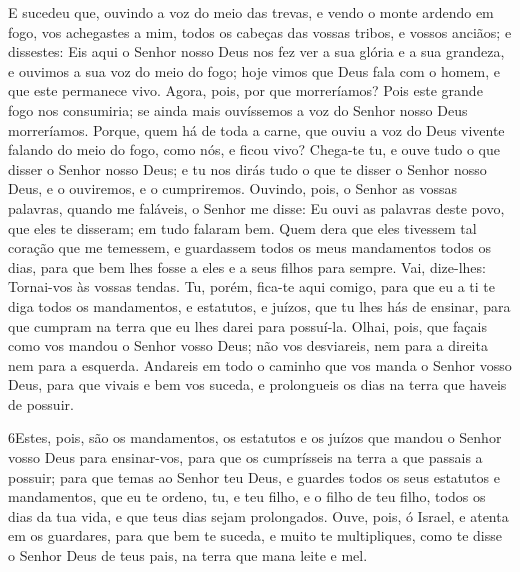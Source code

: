 E sucedeu que, ouvindo a voz do meio das trevas, e vendo o monte
ardendo em fogo, vos achegastes a mim, todos os cabeças das vossas
tribos, e vossos anciãos; e dissestes: Eis aqui o Senhor
nosso Deus nos fez ver a sua glória e a sua grandeza, e ouvimos a
sua voz do meio do fogo; hoje vimos que Deus fala com o homem, e que
este permanece vivo. Agora, pois, por que morreríamos? Pois
este grande fogo nos consumiria; se ainda mais ouvíssemos a voz do
Senhor nosso Deus morreríamos. Porque, quem há de toda a
carne, que ouviu a voz do Deus vivente falando do meio do fogo, como
nós, e ficou vivo? Chega-te tu, e ouve tudo o que disser o
Senhor nosso Deus; e tu nos dirás tudo o que te disser o Senhor
nosso Deus, e o ouviremos, e o cumpriremos. Ouvindo, pois, o
Senhor as vossas palavras, quando me faláveis, o Senhor me disse: Eu
ouvi as palavras deste povo, que eles te disseram; em tudo falaram
bem. Quem dera que eles tivessem tal coração que me temessem,
e guardassem todos os meus mandamentos todos os dias, para que bem
lhes fosse a eles e a seus filhos para sempre. Vai,
dize-lhes: Tornai-vos às vossas tendas. Tu, porém, fica-te
aqui comigo, para que eu a ti te diga todos os mandamentos, e
estatutos, e juízos, que tu lhes hás de ensinar, para que cumpram na
terra que eu lhes darei para possuí-la. Olhai, pois, que
façais como vos mandou o Senhor vosso Deus; não vos desviareis, nem
para a direita nem para a esquerda. Andareis em todo o
caminho que vos manda o Senhor vosso Deus, para que vivais e bem vos
suceda, e prolongueis os dias na terra que haveis de possuir.

\medskip

\lettrine{6} Estes, pois, são os mandamentos, os estatutos e
os juízos que mandou o Senhor vosso Deus para ensinar-vos, para que
os cumprísseis na terra a que passais a possuir; para que temas
ao Senhor teu Deus, e guardes todos os seus estatutos e mandamentos,
que eu te ordeno, tu, e teu filho, e o filho de teu filho, todos os
dias da tua vida, e que teus dias sejam prolongados. Ouve, pois,
ó Israel, e atenta em os guardares, para que bem te suceda, e muito
te multipliques, como te disse o Senhor Deus de teus pais, na terra
que mana leite e mel.

